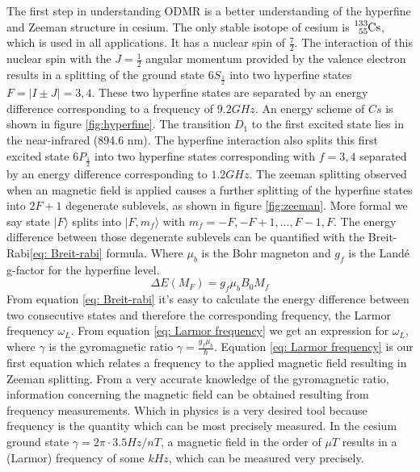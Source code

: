 \documentclass[a4paper,kul]{kulakarticle} %
\begin{document}
The first step in understanding ODMR is a better understanding of the hyperfine and Zeeman structure in cesium. The only stable isotope of cesium is $\ce{^{133}_{55}Cs}$, which is used in all applications. It has a nuclear spin of $\frac{7}{2}.$ The interaction of this nuclear spin with the $J=\frac{1}{2}$ angular momentum provided by the valence electron results in a splitting of the ground state $6S_{\frac{1}{2}}$ into two hyperfine states $F = |I \pm J| = 3, 4$. These two hyperfine states are separated by an energy difference corresponding to a frequency of $9.2 GHz$. An energy scheme of $Cs$ is shown in figure \ref{fig:hyperfine}. The transition $D_{1}$ to the first excited state lies in the near-infrared (894.6 nm). The hyperfine interaction also splits this first excited state $6P_{\frac{1}{2}}$ into two hyperfine states corresponding with $f = 3,4$ separated by an energy difference corresponding to $1.2 GHz$. The zeeman splitting observed when an magnetic field is applied causes a further splitting of the hyperfine states into $2F+1$ degenerate sublevels, as shown in figure \ref{fig:zeeman}. More formal we say state $|F\rangle$ splits into $|F,m_{f}\rangle$ with $m_{f} = -F, -F+1,...,F-1,F$. The energy difference between those degenerate sublevels can be quantified with the Breit-Rabi\ref{eq: Breit-rabi} formula. Where $\mu_{b}$ is the Bohr magneton and $g_{f}$ is the Landé g-factor for the hyperfine level.
\begin{equation}
	\label{eq: Breit-rabi}
	\Delta E \left(M_{F}\right) = g_{f}\mu_{b}B_{0}M_{f} 
\end{equation}
From equation \ref{eq: Breit-rabi} it's easy to calculate the energy difference between two consecutive states and therefore the corresponding frequency, the Larmor frequency $\omega_{L}$. From equation \ref{eq: Larmor frequency} we get an expression for $\omega_{L}$, where $\gamma$ is the gyromagnetic ratio $\gamma = \frac{g_{f}\mu_{b}}{\hbar}$. Equation \ref{eq: Larmor frequency} is our first equation which relates a frequency to the applied magnetic field resulting in Zeeman splitting. From a very accurate knowledge of the gyromagnetic ratio, information concerning the magnetic field can be obtained resulting from frequency measurements. Which in physics is a very desired tool because frequency is the quantity which can be most precisely measured. In the cesium ground state $\gamma = 2\pi \cdot 3.5 Hz/nT$, a magnetic field in the order of $\mu T$ results in a (Larmor) frequency of some $kHz$, which can be measured very precisely.
\end{document}
